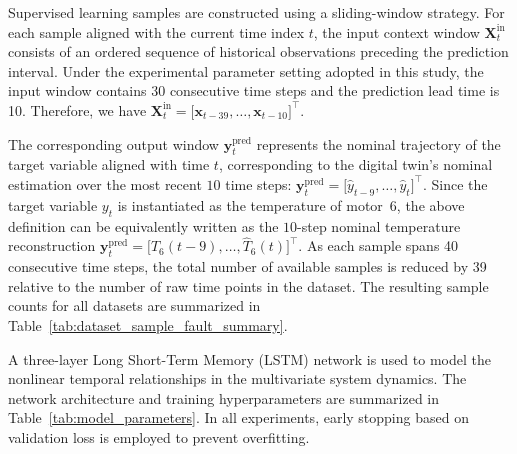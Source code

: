 \documentclass[a4paper,10pt]{cas-sc}%
\begin{document}
Supervised learning samples are constructed using a sliding-window strategy.
For each sample aligned with the current time index $t$, the input context window
$\boldsymbol{X}_t^{\mathrm{in}}$ consists of an ordered sequence of historical
observations preceding the prediction interval.
Under the experimental parameter setting adopted in this study, the input
window contains $30$ consecutive time steps and the prediction lead time is 10. Therefore, we have
$
	\boldsymbol{X}_t^{\mathrm{in}}
	=
	\big[
		\boldsymbol{x}_{t-39},\ldots,\boldsymbol{x}_{t-10}
		\big]^\top .$



The corresponding output window $\boldsymbol{y}_t^{\mathrm{pred}}$ represents the
nominal trajectory of the target variable aligned with time $t$, corresponding
to the digital twin's nominal estimation over the most recent $10$ time steps:
$\boldsymbol{y}_t^{\mathrm{pred}}
	=
	\big[
		\hat{y}_{t-9},\ldots,\hat{y}_t
		\big]^\top .$
Since the target variable $y_t$ is instantiated
as the temperature of motor~6, the above definition can be equivalently written as the $10$-step nominal temperature reconstruction
$\boldsymbol{y}_t^{\mathrm{pred}}
	=
	\big[
		\hat{T}_6(t-9),\ldots,\hat{T}_6(t)
		\big]^\top .$
As each sample spans 40 consecutive time steps, the total number of available samples is reduced by 39 relative to the number of raw time points in the dataset. The resulting sample counts for all datasets are summarized in Table~\ref{tab:dataset_sample_fault_summary}.

A three-layer Long Short-Term Memory (LSTM) network is used to model the nonlinear temporal relationships in the multivariate system dynamics. The network architecture and training hyperparameters are summarized in Table~\ref{tab:model_parameters}. In all experiments, early stopping based on validation loss is employed to prevent overfitting.
\end{document}
